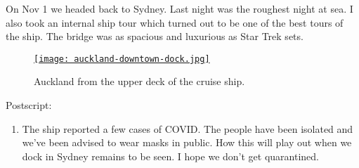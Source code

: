 On Nov 1 we headed back to Sydney. Last night was the roughest night at
sea. I also took an internal ship tour which turned out to be one of the
best tours of the ship. The bridge was as spacious and luxurious as Star
Trek sets.


\captionsetup[figure]{labelformat=empty}
\begin{figure}[htbp]
\centering
\href{https://conceptcontrol.smugmug.com/Trips/Overseas/Australia-New-Zealand-2022/i-vX9x9tw/A}{\texttt{[image: auckland-downtown-dock.jpg]}}
\caption{Auckland from the upper deck of the cruise ship.}
\label{fig:7606x4}
\end{figure}

Postscript:

\begin{enumerate}
\def\labelenumi{\arabic{enumi}.}
\item
  The ship reported a few cases of COVID. The people have been isolated
  and we've been advised to wear masks in public. How this will play out
  when we dock in Sydney remains to be seen. I hope we don't get
  quarantined.
\end{enumerate}


%
